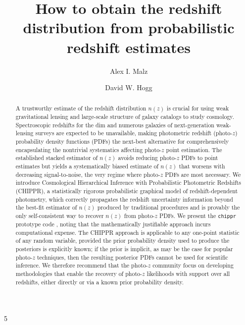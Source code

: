 \documentclass[iop]{emulateapj}
\begin{document}

\title{How to obtain the redshift distribution from probabilistic redshift estimates}

\author{Alex I. Malz}
\author{David W. Hogg}5


\begin{abstract}
A trustworthy estimate of the redshift distribution $n(z)$ is crucial for using weak gravitational lensing and large-scale structure of galaxy catalogs to study cosmology.
Spectroscopic redshifts for the dim and numerous galaxies of next-generation weak-lensing surveys are expected to be unavailable, making photometric redshift (photo-$z$) probability density functions (PDFs) the next-best alternative for comprehensively encapsulating the nontrivial systematics affecting photo-$z$ point estimation.
The established stacked estimator of $n(z)$ avoids reducing photo-$z$ PDFs to point estimates but yields a systematically biased estimate of $n(z)$ that worsens with decreasing signal-to-noise, the very regime where photo-$z$ PDFs are most necessary.
We introduce Cosmological Hierarchical Inference with Probabilistic Photometric Redshifts (\textsc{CHIPPR}), a statistically rigorous probabilistic graphical model of redshift-dependent photometry, which correctly propagates the redshift uncertainty information beyond the best-fit estimator of $n(z)$ produced by traditional procedures and is provably the only self-consistent way to recover $n(z)$ from photo-$z$ PDFs.
We present the \texttt{chippr} prototype code
, noting that the mathematically justifiable approach incurs computational expense.
The \textsc{CHIPPR} approach is applicable to any one-point statistic of any random variable, provided the prior probability density used to produce the posteriors is explicitly known;
if the prior is implicit, as may be the case for popular photo-$z$ techniques, then the resulting posterior PDFs cannot be used for scientific inference.
We therefore recommend that the photo-$z$ community focus on developing methodologies that enable the recovery of photo-$z$ likelihoods with support over all redshifts, either directly or via a known prior probability density.
\end{abstract}
\end{document}
